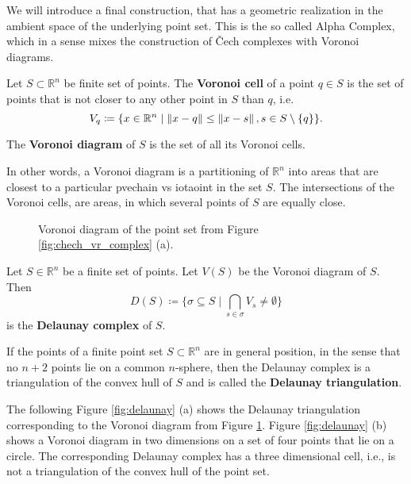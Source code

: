 We will introduce a final construction, that has a geometric realization in the ambient space of the underlying point set. This is the so called Alpha Complex, which in a sense mixes the construction of \v{C}ech complexes with Voronoi diagrams.

\begin{defi}
Let $S \subset \mathbb{R}^n$ be finite set of points. The \textbf{Voronoi cell} of a point $q \in S$ is the set of points that is not closer to any other point in $S$ than $q$, i.e. \[
    V_q \coloneqq \{x \in \mathbb{R}^n \mid \left\lVert x-q\right\rVert \leq \left\lVert x-s\right\rVert, s \in S\setminus\{q\}\}.
\]

The \textbf{Voronoi diagram} of $S$ is the set of all its Voronoi cells. 
\end{defi}

In other words, a Voronoi diagram is a partitioning of $\mathbb{R}^n$ into areas that are closest to a particular pvechain vs iotaoint in the set $S$. The intersections of the Voronoi cells, are areas, in which several points of $S$ are equally close. 

\begin{figure}[H]
\begin{center}

\end{center}
\caption{Voronoi diagram of the point set from Figure \ref{fig:chech_vr_complex} (a).}
\label{fig:voronoi}
\end{figure}

\begin{defi}
Let $S \in \mathbb{R}^n$ be a finite set of points. Let $V(S)$ be the Voronoi diagram of $S$. Then
\[
D(S) \coloneqq \{\sigma \subseteq S \mid  \bigcap\limits_{s \in \sigma}V_s \neq \emptyset \}
\] 
is the \textbf{Delaunay complex} of $S$.
\end{defi}

If the points of a finite point set $S \subset \mathbb{R}^n$ are in general position, in the sense that no $n+2$ points lie on a common $n$-sphere, then the Delaunay complex is a triangulation of the convex hull of $S$ and is called the \textbf{Delaunay triangulation}. 

The following Figure \ref{fig:delaunay} (a) shows the Delaunay triangulation corresponding to the Voronoi diagram from Figure \ref{fig:voronoi}. Figure \ref{fig:delaunay} (b) shows a Voronoi diagram in two dimensions on  a set of four points that lie on a circle. The corresponding Delaunay complex has a three dimensional cell, i.e., is not a triangulation of the convex hull of the point set.

